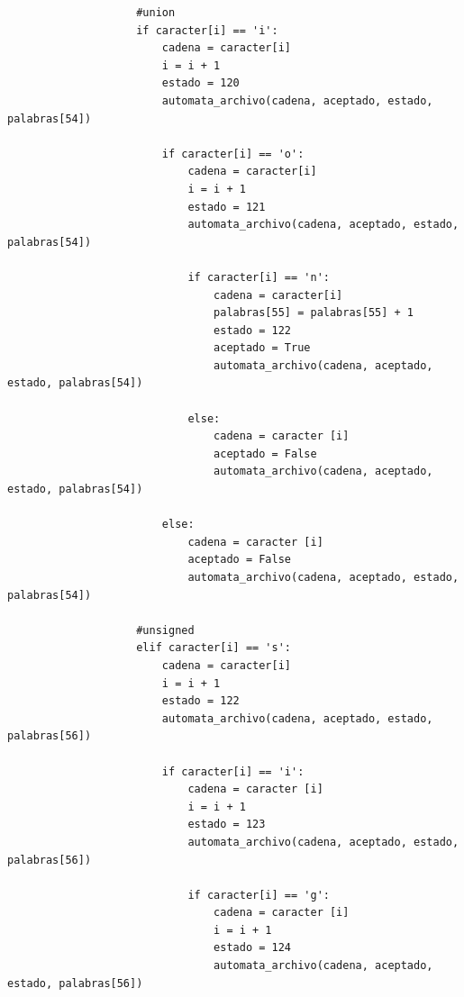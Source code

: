 \documentclass{article}
\begin{document}
\begin{flushleft}
\begin{lstlisting}
                    #union
                    if caracter[i] == 'i':
                        cadena = caracter[i]
                        i = i + 1
                        estado = 120
                        automata_archivo(cadena, aceptado, estado, palabras[54])
                        
                        if caracter[i] == 'o':
                            cadena = caracter[i]
                            i = i + 1
                            estado = 121
                            automata_archivo(cadena, aceptado, estado, palabras[54])
                        
                            if caracter[i] == 'n':
                                cadena = caracter[i]
                                palabras[55] = palabras[55] + 1
                                estado = 122
                                aceptado = True
                                automata_archivo(cadena, aceptado, estado, palabras[54])
                                
                            else:
                                cadena = caracter [i]
                                aceptado = False
                                automata_archivo(cadena, aceptado, estado, palabras[54])
                                
                        else:
                            cadena = caracter [i]
                            aceptado = False
                            automata_archivo(cadena, aceptado, estado, palabras[54])
                                
                    #unsigned
                    elif caracter[i] == 's':
                        cadena = caracter[i]
                        i = i + 1
                        estado = 122
                        automata_archivo(cadena, aceptado, estado, palabras[56])
                        
                        if caracter[i] == 'i':
                            cadena = caracter [i]
                            i = i + 1
                            estado = 123
                            automata_archivo(cadena, aceptado, estado, palabras[56])              
                            
                            if caracter[i] == 'g':
                                cadena = caracter [i]
                                i = i + 1
                                estado = 124
                                automata_archivo(cadena, aceptado, estado, palabras[56])
                                

\end{lstlisting}
\end{flushleft}
\end{document}
